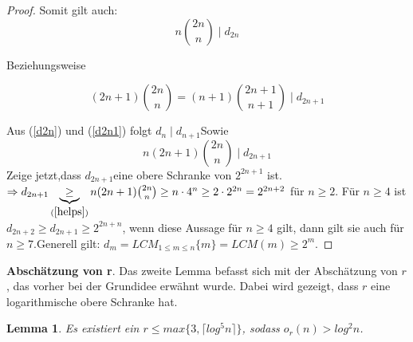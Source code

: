 \documentclass[12pt,oneside]{article}
\newtheorem{lemma}[theorem]{Lemma}
\theoremstyle{remark}
\theoremstyle{definition}
\begin{document}
\begin{proof}
Somit gilt auch: 
\begin{equation}\label{d2n}
    n {2n\choose n} \mid d_{2n}
\end{equation}

Beziehungsweise 

\begin{equation}\label{d2n1}
    (2n + 1) {2n \choose n} = (n + 1) {2n + 1 \choose n + 1} \mid d_{2n + 1} 
\end{equation}

\smallskip
Aus (\ref{d2n}) und (\ref{d2n1}) folgt $d_{n} \mid d_{n+1}$\newline\newline Sowie 
\begin{equation}\label{helps}
    n(2n + 1) {2n \choose n} \mid d_{2n + 1}
\end{equation}
\newline\newline
Zeige jetzt,dass $d_{2n+1} $eine obere Schranke von $2^{2n + 1}$ ist.\newline\newline  
$\Rightarrow d_{2n + 1} \underbrace{\geq}_{(\ref{helps})} n (2n + 1) {2n \choose n} \geq n \cdot 4^n \geq 2 \cdot 2^{2n} = 2^{2n + 2}$ für $n \geq 2$.\newline\newline
Für $n \geq 4$ ist $d_{2n + 2} \geq d_{2n + 1} \geq 2^{2n + n }$, wenn diese Aussage für $n \geq 4 $ gilt, dann gilt sie auch für $n \geq 7$.\newline\newline Generell gilt: $d_{m} = LCM_{1 \leq m \leq n} \{m\} = LCM(m) \geq  2^m $.
\end{proof}

\textbf{Abschätzung von r}.\newline\newline
Das zweite Lemma befasst sich mit der Abschätzung von $r$, das vorher bei der Grundidee erwähnt wurde. Dabei wird gezeigt, dass $r$ eine logarithmische obere Schranke hat.  

\begin{lemma}
Es existiert ein $ r \leq max \{ 3, \lceil log^5 n \rceil \}$, sodass $o_{r}(n) > log^2 n$.
\end{lemma}
\end{document}
